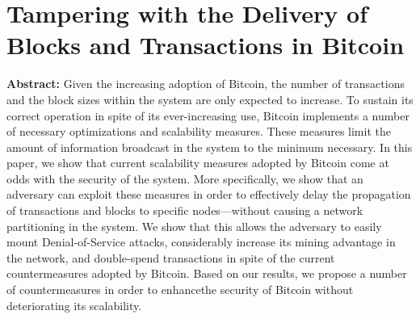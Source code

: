 \section{Tampering with the Delivery of Blocks and Transactions in Bitcoin}

\textbf{Abstract:} 
Given the increasing adoption of Bitcoin, the number of transactions and the block sizes within the system are only expected to increase. To sustain its correct operation in spite of its ever-increasing use, Bitcoin implements a number of necessary optimizations and scalability measures. These measures limit the amount of information broadcast in the system to the minimum necessary. In this paper, we show that current scalability measures adopted by Bitcoin come at odds with the security of the system. More specifically, we show that an adversary can exploit these measures in order to effectively delay the propagation of transactions and blocks to specific nodes—without causing a network partitioning in the system. We show that this allows the adversary to easily mount Denial-of-Service attacks, considerably increase its mining advantage in the network, and double-spend transactions in spite of the current countermeasures adopted by Bitcoin. Based on our results, we propose a number of countermeasures in order to enhancethe security of Bitcoin without deteriorating its scalability.
